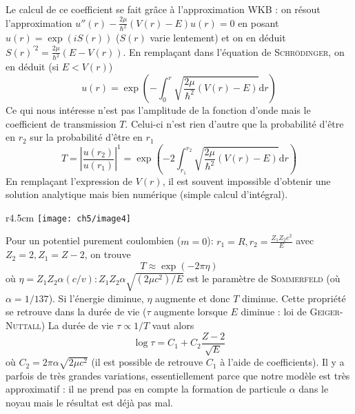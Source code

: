 Le calcul de ce coefficient se fait grâce à l'approximation \textsc{WKB} : on résout l'approximation 
$u''(r)-\frac{2\mu}{\hbar^2}(V(r)-E)u(r)=0$ en posant $u(r) = \exp(iS(r))$ ($S(r)$ varie lentement) et on en 
déduit $S(r)^{'2} = \frac{2\mu}{\hbar^2}(E-V(r))$. En remplaçant dans l'équation de \textsc{Schrödinger}, on 
en déduit (si $E<V(r)$)
\begin{equation}
u(r) = \exp\left(-\int_0^r \sqrt{\frac{2\mu}{\hbar^2}(V(r)-E)}\text{d}r\right)
\end{equation}
Ce qui nous intéresse n'est pas l'amplitude de la fonction d'onde mais le coefficient de transmission $T$. 
Celui-ci n'est rien d'autre que la probabilité d'être en $r_2$ sur la probabilité d'être en $r_1$ 
\begin{equation}
T = \left|\dfrac{u(r_2)}{u(r_1)}\right|^1 = \exp\left( -2\int_{r_1}^{r_2} \sqrt{\frac{2\mu}{\hbar^2}(V(r)-E)}
\text{d}r\right)
\end{equation}
En remplaçant l'expression de $V(r)$, il est souvent impossible d'obtenir une solution analytique mais bien
numérique (simple calcul d'intégral).\\


	\begin{wrapfigure}[9]{r}{4.5cm}
	\vspace{-5mm}
	\texttt{[image: ch5/image4]}
	\end{wrapfigure}
	
Pour un potentiel purement coulombien ($m=0$): $r_1=R, r_2=\frac{Z_1Z_2e^2}{E}$ avec $Z_2=2, Z_1=Z-2$, on 
trouve
\begin{equation}
T \approx \exp(-2\pi\eta)
\end{equation}
où $\eta= Z_1Z_2\alpha(c/v) : Z_1Z_2\alpha\sqrt{(2\mu c^2)/E}$ est le paramètre de \textsc{Sommerfeld} (où
$\alpha = 1/137$). Si l'énergie diminue, $\eta$ augmente et donc $T$ diminue. Cette propriété se retrouve
dans la durée de vie ($\tau$ augmente lorsque $E$ diminue : loi de \textsc{Geiger-Nuttall})
La durée de vie $\tau \propto 1/T$ vaut alors
\begin{equation}
\log\tau = C_1+C_2\frac{Z-2}{\sqrt{E}}
\end{equation}
où $C_2 = 2\pi\alpha\sqrt{2\mu c^2}$ (il est possible de retrouve $C_1$ à l'aide de coefficients).
Il y a parfois de très grandes variations, essentiellement parce que notre modèle est très approximatif : il 
ne prend pas en compte la formation de particule $\alpha$ dans le noyau mais le résultat est déjà pas mal.


